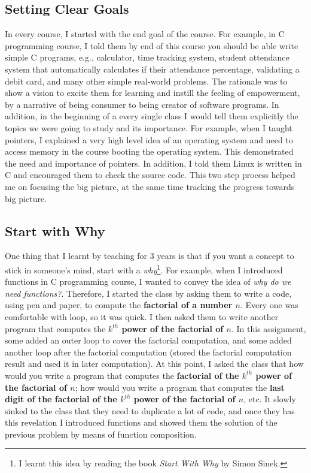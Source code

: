 \documentclass[a4paper]{article}
\begin{document}
\subsection{Setting Clear Goals}
In every course, I started with the end goal of the course. For example, 
in C programming course, I told them by end of this course you should be 
able write simple C programs, e.g., calculator, time tracking system,
student attendance system that automatically calculates if their attendance percentage, 
validating a debit card, and many other simple real-world problems. The rationale was 
to show a vision to excite them 
for learning and instill the feeling of empowerment, by a narrative of 
being consumer to being creator of software programs.
In addition, in the beginning of a every single class 
I would tell them explicitly the topics we were going to study and 
its importance. For example, when I taught pointers, I explained a 
very high level idea of an operating system and need to access memory 
in the course booting the operating system. This demonstrated the 
need and importance of pointers. In addition, I told them
Linux is written in C and encouraged them to check the source code.
This two step process helped me on focusing the big picture, 
at the same time tracking the progress towards big picture.



\subsection{Start with Why}
One thing that I learnt by teaching for 3 years is that if you want a concept 
to stick in someone's mind, start with a \textit{why}\footnote{I learnt this idea by reading the book 
\textit{Start With Why} by Simon Sinek.}. For example, when I introduced functions 
in C programming course, I wanted to convey the idea of \textit{why do we need functions?}. Therefore, I started the class by 
asking them to write a code, using pen and paper, to compute the \textbf{factorial of a number $n$}. 
Every one was comfortable with loop, so it was quick. I then asked them to write 
another program that computes the \textbf{$k^{th}$ power of the factorial of $n$}. 
In this assignment, some added an outer loop to cover the factorial computation, 
and some added another loop after the factorial computation (stored the factorial 
computation result and used it in later computation). 
At this point, I asked the class 
that how would you write a program that computes the \textbf{factorial of 
the $k^{th}$ power of the factorial of $n$}; how would you write a program 
that computes the \textbf{last digit of 
the factorial of the $k^{th}$ power of the factorial of $n$}, etc. It slowly 
sinked to the class that they need to duplicate a lot of code, and once 
they has this revelation I introduced functions 
and showed them the solution of the previous problem by means of function composition.
\end{document}
